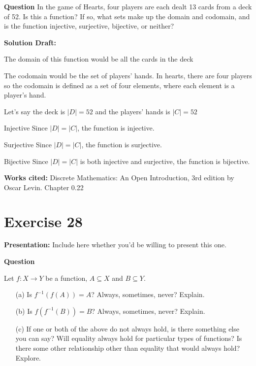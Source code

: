 \documentclass{article}
\begin{document}
\vspace{0.5cm} %

\noindent\textbf{Question}
In the game of Hearts, four players are each dealt 13 cards from a deck of 52. Is this a function? If so, what sets make up the domain and codomain, and is the function injective, surjective, bijective, or neither?


\noindent\textbf{Solution Draft:} 

The domain of this function would be all the cards in the deck

The codomain would be the set of players' hands. In hearts, there are four players so the codomain is defined as a set of four elements, where each element is a player's hand.

Let's say the deck is $|D| = 52$ and the players' hands is $|C| = 52$

Injective
Since $|D| = |C|$, the function is injective.

Surjective
Since $|D| = |C|$, the function is surjective.

Bijective
Since $|D| = |C|$ is both injective and surjective, the function is bijective.

\vspace{0.5cm}
\textbf{Works cited:}
Discrete Mathematics: An Open Introduction, 3rd edition by Oscar Levin. Chapter 0.22
\section*{Exercise 28}  

\noindent\textbf{Presentation:} Include here whether you'd be willing to present this one. 

\vspace{0.5cm} %

\noindent\textbf{Question}

Let \( f : X \to Y \) be a function, \( A \subseteq X \) and \( B \subseteq Y \).

\begin{enumerate}
    \item[(a)] Is \( f^{-1}(f(A)) = A \)? Always, sometimes, never? Explain.
    \item[(b)] Is \( f(f^{-1}(B)) = B \)? Always, sometimes, never? Explain.
    \item[(c)] If one or both of the above do not always hold, is there something else you can say? Will equality always hold for particular types of functions? Is there some other relationship other than equality that would always hold? Explore.
\end{enumerate}
\end{document}
